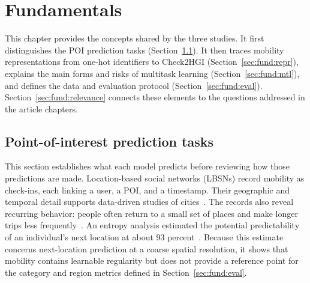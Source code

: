 

\chapter{Fundamentals}
\label{ch:fundamentals}

This chapter provides the concepts shared by the three studies. It first distinguishes
the POI prediction tasks (Section~\ref{sec:fund:tasks}). It then traces mobility
representations from one-hot identifiers to Check2HGI
(Section~\ref{sec:fund:repr}), explains the main forms and risks of multitask learning
(Section~\ref{sec:fund:mtl}), and defines the data and evaluation protocol
(Section~\ref{sec:fund:eval}). Section~\ref{sec:fund:relevance} connects these
elements to the questions addressed in the article chapters.


\section{Point-of-interest prediction tasks}
\label{sec:fund:tasks}

This section establishes what each model predicts before reviewing how those
predictions are made. Location-based social networks (LBSNs) record mobility as
check-ins, each linking a user, a POI, and a timestamp. Their geographic and temporal
detail supports data-driven studies of cities~\cite{silva2019urbancomputing}. The
records also reveal recurring behavior: people often return to a small set of places
and make longer trips less frequently~\cite{cho2011gowalla}. An entropy analysis
estimated the potential predictability of an individual's next location at about 93
percent~\cite{song2010limits}. Because this estimate concerns next-location prediction
at a coarse spatial resolution, it shows that mobility contains learnable regularity
but does not provide a reference point for the category and region metrics defined in
Section~\ref{sec:fund:eval}.

